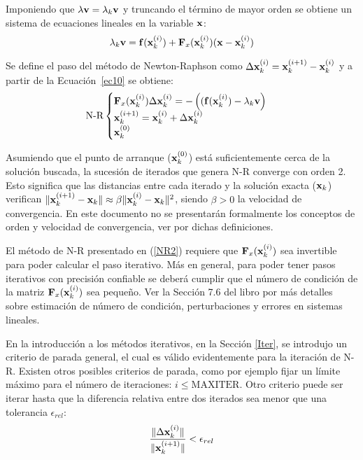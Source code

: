Imponiendo que $\lambda {\bf v}=\lambda_k {\bf v}$ y truncando el término de mayor orden se obtiene un sistema de ecuaciones  lineales en la variable ${\bf x}$:
%
\begin{equation}\label{ec10}
\lambda_k {\bf v} = {\bf f}({\bf x}_k^{(i)})+{\bf F}_x({\bf x}_k^{(i)})({\bf x}-{\bf x}_k^{(i)})
\end{equation}

Se define el paso del método de Newton-Raphson como $\Delta {\bf x}_k^{(i)}={\bf x}_k^{(i+1)}-{\bf x}_k^{(i)}$ y a partir de la Ecuación~\eqref{ec10} se obtiene:
%
\begin{equation}\label{NR2}
\text{N-R}
\begin{cases} 
	{\bf F}_x({\bf x}_k^{(i)})\Delta {\bf x}_k^{(i)} =-\left(({\bf f}({\bf x}_k^{(i)})-\lambda_k {\bf v}\right)\\
	{\bf x}_k^{(i+1)}={\bf x}_k^{(i)}+\Delta {\bf x}_k^{(i)} \\
	{\bf x}_k^{(0)}
\end{cases}
\end{equation}


Asumiendo que el punto de arranque (${\bf x}_k^{(0)}$) está suficientemente cerca de la solución buscada, la sucesión de iterados que genera N-R converge con orden 2. Esto significa que las distancias entre cada iterado y la solución exacta (${\bf x}_k$) verifican $\|{\bf x}_k^{(i+1)}-{\bf x}_k\| \approx \beta \|{\bf x}_k^{(i)}-{\bf x}_k\|^2$, siendo $\beta>0$ la velocidad de convergencia. %
%
En este documento no se presentarán formalmente los conceptos de orden y velocidad de convergencia, ver \citep{quarteroni2007numeric} por dichas definiciones.

El método de N-R presentado en (\ref{NR2}) requiere que ${\bf F}_x({\bf x}_k^{(i)})$ sea invertible para poder calcular el paso iterativo. Más en general, para poder tener pasos iterativos con precisión confiable se deberá cumplir que el número de condición de la matriz ${\bf F}_x({\bf x}_k^{(i)})$ sea pequeño. Ver la Sección 7.6 del libro \citep{dahquist2008numeric} por más detalles sobre estimación de número de condición, perturbaciones y errores en sistemas lineales.

En la introducción a los métodos iterativos, en la Sección \ref{Iter}, se introdujo un criterio de parada general, el cual es válido evidentemente para la iteración de N-R. Existen otros posibles criterios de parada, como por ejemplo fijar un límite máximo para el número de iteraciones: $i\leq \text{MAXITER}$. Otro criterio puede ser iterar hasta que la diferencia relativa entre dos iterados sea menor que una tolerancia $\epsilon_{rel}$:
%
\begin{equation}
	\frac{\|\Delta {\bf x}_k^{(i)}\|}{\|{\bf x}_k^{(i+1)}\|} < \epsilon_{rel}
\end{equation}

